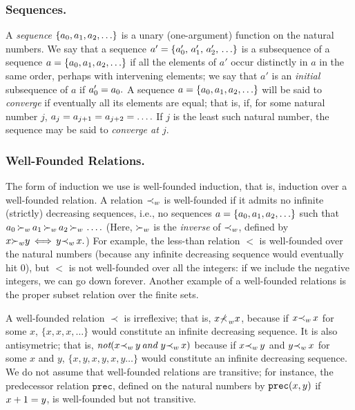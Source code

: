 \documentclass[runningheads]{llncs}
\DeclareMathOperator{\uand}{\emph{and}\,}
\DeclareMathOperator{\unot}{\emph{not}\kern-.0pt}
\DeclareMathOperator{\uiff}{\iff}
\begin{document}
\subsubsection{Sequences.}  A \emph{sequence}  $\{{a}_{0}, {a}_{1}, {a}_{2}, \ldots\} $ is a unary (one-argument) function on the natural numbers. We say that a sequence $a' = \{{a}_{0}',\, {a}_{1}',\, {a}_{2}',\, \ldots\}  $ is a subsequence of a sequence $a =\{{a}_{0}, {a}_{1}, {a}_{2}, \ldots\} $ if all the elements of $a'$ occur distinctly in $a$ in the same order, perhaps with intervening elements; we say that $a'$ is an \emph{initial} subsequence of $a$ if ${a}_{0}' = {a}_{0}.$  A sequence  $a = \{{a}_{0}, {a}_{1}, {a}_{2}, \ldots\}$ will be said to \emph{converge} if eventually all its elements are equal; that is, if, for some natural number $j$, ${a}_{j} = {a}_{j+1} = {a}_{j+2} =\ldots .$  If $j$  is the least such natural number, the sequence may be said to \emph{converge at $j$}.
 
 
 
 \subsubsection{Well-Founded Relations.} The form of induction we use is well-founded induction, that is, induction over a well-founded relation.  A relation  ${\prec}_{w}$ is well-founded if it admits no infinite (strictly) decreasing sequences, i.e., no sequences $a =\{{a}_{0}, {a}_{1}, {a}_{2}, \ldots\} $ such that ${a}_{0} \, {\succ}_{w} \, {a}_{1} \, {\succ}_{w} \, {a}_{2} \, {\succ}_{w} \,\ldots.$ (Here, ${\succ}_{w}$ is the \emph{inverse} of ${\prec}_{w}$, defined by $\var{x} \expsub{\succ}{w} \var{y} \uiff \var{y} \expsub{\prec}{w} \,\var{x}.$) For example, the less-than relation $<$ is well-founded over the natural numbers (because any infinite decreasing sequence would eventually hit 0), but $<$ is not well-founded over all the integers: if we include the negative integers, we can go down forever.  Another example of a well-founded relations is the proper subset relation over the finite sets.
 
 
  A well-founded relation $\prec$ is irreflexive; that is,  $x {\nprec}_{\,w} x$, because if $x {\prec}_{w} \,x$  for some $x$,   $\{x, x, x, \ldots \}$ would constitute an infinite decreasing sequence. It is also antisymetric; that is,  $\unot(\var{x} \expsub{\prec}{w} \,\var{y} \uand \var{y} \expsub{\prec}{w} \,\var{x})$ because if $x {\prec}_{w} \,y$ and $y {\prec}_{w} \,x$ for some $x$ and $y$,  $\{x, y, x,y, x, y \ldots \}$ would constitute an infinite decreasing sequence.  We do not assume that well-founded relations are transitive;  for instance, the predecessor relation $\texttt{prec}$, defined on the natural numbers by $\texttt{prec}(x, y)$ if $x + 1 = y$, is well-founded but not transitive.
 
\end{document}
